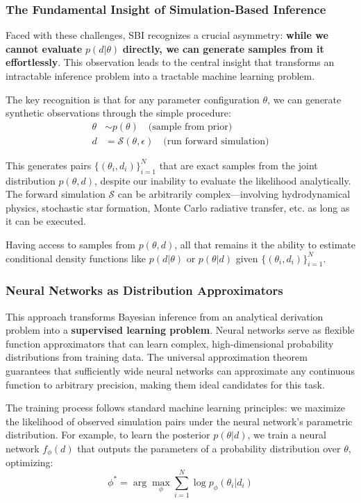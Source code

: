\documentclass[11pt,a4paper]{article}
\theoremstyle{definition}
\begin{document}
\subsubsection{The Fundamental Insight of Simulation-Based Inference}

Faced with these challenges, SBI recognizes a crucial asymmetry: \textbf{while we cannot evaluate} $p(d|\theta)$ \textbf{directly, we can generate samples from it effortlessly}. This observation leads to the central insight that transforms an intractable inference problem into a tractable machine learning problem.

The key recognition is that for any parameter configuration $\theta$, we can generate synthetic observations through the simple procedure:
\begin{align}
    \theta &\sim p(\theta) \quad \text{(sample from prior)} \\
    d &= \mathcal{S}(\theta, \epsilon) \quad \text{(run forward simulation)}
\end{align}

This generates pairs $\{(\theta_i, d_i)\}_{i=1}^N$ that are exact samples from the joint distribution $p(\theta, d)$, despite our inability to evaluate the likelihood analytically. The forward simulation $\mathcal{S}$ can be arbitrarily complex—involving hydrodynamical physics, stochastic star formation, Monte Carlo radiative transfer, etc. as long as it can be executed.

Having access to samples from $p(\theta, d)$, all that remains it the ability to estimate conditional density functions like $p(d|\theta)$ or $p(\theta|d)$ given $\{(\theta_i, d_i)\}_{i=1}^N$.

\subsubsection{Neural Networks as Distribution Approximators}

This approach transforms Bayesian inference from an analytical derivation problem into a \textbf{supervised learning problem}. Neural networks serve as flexible function approximators that can learn complex, high-dimensional probability distributions from training data. The universal approximation theorem guarantees that sufficiently wide neural networks can approximate any continuous function to arbitrary precision, making them ideal candidates for this task.

The training process follows standard machine learning principles: we maximize the likelihood of observed simulation pairs under the neural network's parametric distribution. For example, to learn the posterior $p(\theta|d)$, we train a neural network $f_\phi(d)$ that outputs the parameters of a probability distribution over $\theta$, optimizing:
\begin{equation}
    \phi^* = \arg\max_\phi \sum_{i=1}^N \log p_\phi(\theta_i | d_i)
\end{equation}
\end{document}
